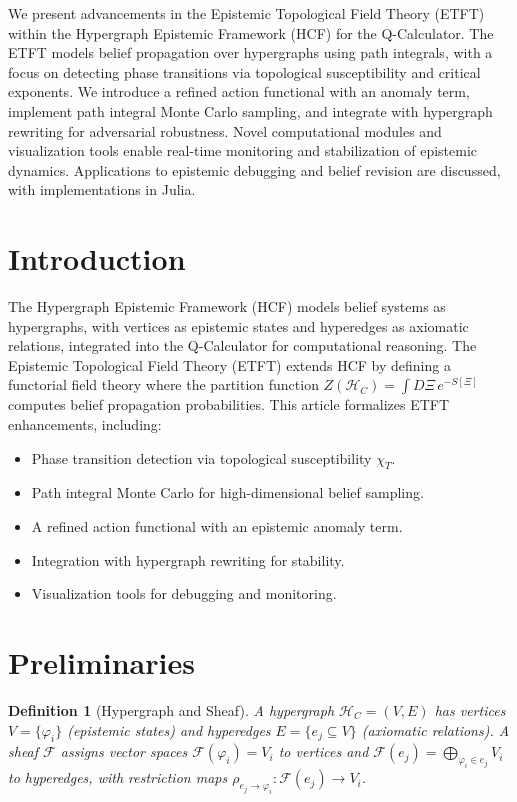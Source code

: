 \documentclass[12pt]{article}
\newtheorem{definition}[theorem]{Definition}
\begin{document}
We present advancements in the Epistemic Topological Field Theory (ETFT) within the Hypergraph Epistemic Framework (HCF) for the Q-Calculator. The ETFT models belief propagation over hypergraphs using path integrals, with a focus on detecting phase transitions via topological susceptibility and critical exponents. We introduce a refined action functional with an anomaly term, implement path integral Monte Carlo sampling, and integrate with hypergraph rewriting for adversarial robustness. Novel computational modules and visualization tools enable real-time monitoring and stabilization of epistemic dynamics. Applications to epistemic debugging and belief revision are discussed, with implementations in Julia.


\section{Introduction}
The Hypergraph Epistemic Framework (HCF) models belief systems as hypergraphs, with vertices as epistemic states and hyperedges as axiomatic relations, integrated into the Q-Calculator for computational reasoning. The Epistemic Topological Field Theory (ETFT) extends HCF by defining a functorial field theory where the partition function \(Z(\mathcal{H}_C) = \int D\Xi \, e^{-S[\Xi]}\) computes belief propagation probabilities. This article formalizes ETFT enhancements, including:

\begin{itemize}
    \item Phase transition detection via topological susceptibility \(\chi_T\).
    \item Path integral Monte Carlo for high-dimensional belief sampling.
    \item A refined action functional with an epistemic anomaly term.
    \item Integration with hypergraph rewriting for stability.
    \item Visualization tools for debugging and monitoring.
\end{itemize}

\section{Preliminaries}
\begin{definition}[Hypergraph and Sheaf]
A hypergraph \(\mathcal{H}_C = (V, E)\) has vertices \(V = \{\varphi_i\}\) (epistemic states) and hyperedges \(E = \{e_j \subseteq V\}\) (axiomatic relations). A sheaf \(\mathcal{F}\) assigns vector spaces \(\mathcal{F}(\varphi_i) = V_i\) to vertices and \(\mathcal{F}(e_j) = \bigoplus_{\varphi_i \in e_j} V_i\) to hyperedges, with restriction maps \(\rho_{e_j \to \varphi_i}: \mathcal{F}(e_j) \to V_i\).
\end{definition}
\end{document}

